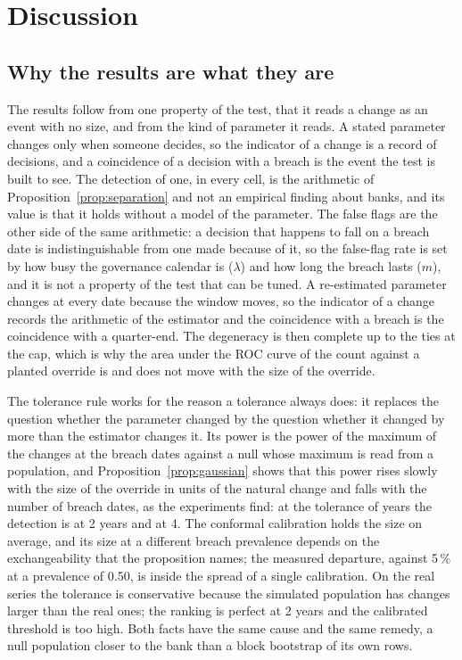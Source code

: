 \section{Discussion}
\label{sec:discussion}

\subsection{Why the results are what they are}
\label{sec:disc-why}

The results follow from one property of the test, that it reads a change as an event with no size, and from the kind of parameter it reads. A stated parameter changes only when someone decides, so the indicator of a change is a record of decisions, and a coincidence of a decision with a breach is the event the test is built to see. The detection of one, in every cell, is the arithmetic of Proposition~\ref{prop:separation} and not an empirical finding about banks, and its value is that it holds without a model of the parameter. The false flags are the other side of the same arithmetic: a decision that happens to fall on a breach date is indistinguishable from one made because of it, so the false-flag rate is set by how busy the governance calendar is ($\lambda$) and how long the breach lasts ($m$), and it is not a property of the test that can be tuned. A re-estimated parameter changes at every date because the window moves, so the indicator of a change records the arithmetic of the estimator and the coincidence with a breach is the coincidence with a quarter-end. The degeneracy is then complete up to the ties at the cap, which is why the area under the ROC curve of the count against a planted override is \fitAucCEngine{} and does not move with the size of the override.

The tolerance rule works for the reason a tolerance always does: it replaces the question whether the parameter changed by the question whether it changed by more than the estimator changes it. Its power is the power of the maximum of the changes at the breach dates against a null whose maximum is read from a population, and Proposition~\ref{prop:gaussian} shows that this power rises slowly with the size of the override in units of the natural change and falls with the number of breach dates, as the experiments find: at the tolerance of \deltaB{} years the detection is \fitAddCTol{} at 2 years and \fitAddDTol{} at 4. The conformal calibration holds the size on average, and its size at a different breach prevalence depends on the exchangeability that the proposition names; the measured departure, \fitMisCTol{} against 5\,\% at a prevalence of 0.50, is inside the spread of a single calibration. On the real series the tolerance is conservative because the simulated population has changes larger than the real ones; the ranking is perfect at 2 years and the calibrated threshold is too high. Both facts have the same cause and the same remedy, a null population closer to the bank than a block bootstrap of its own rows.

